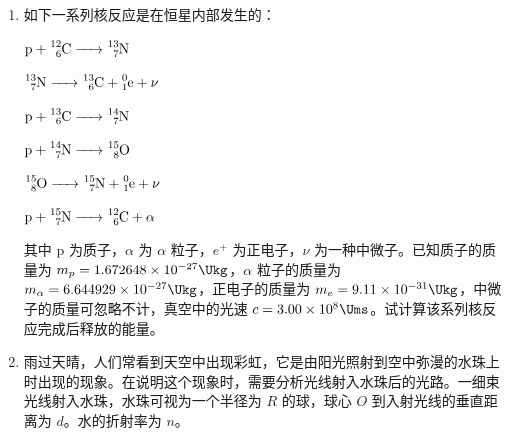 \documentclass[\gkver]{gaokaozhenti}
\begin{document}
\begin{enumerate}
{此时弧 $acb$ 和弧 $adb$ 的电阻分别为 $2\lambda R(\pi-\theta)$ 和 $2\lambda R\theta$，它们并联后的电阻为

$r=\frac{2\lambda R\theta(\pi-\theta)}{\pi}$ ②

杆中的电流为

$I=\frac{E}{r}$ ③

作用在杆上的安培力为

$F=IB(2R\sin\theta)$ ④

由以上各式解得

$F=\frac{2\pi vB^{2}R\sin^{2}\theta}{\lambda\theta(\pi-\theta)}$ ⑤
}

\item
如下一系列核反应是在恒星内部发生的：

$\ce{p + ^{12}_{6}C -> ^{13}_{7}N}$

$\ce{^{13}_{7}N -> ^{13}_{6}C + ^{0}_{1}e + \nu}$

$\ce{p + ^{13}_{6}C -> ^{14}_{7}N}$

$\ce{p + ^{14}_{7}N -> ^{15}_{8}O}$

$\ce{^{15}_{8}O -> ^{15}_{7}N + ^{0}_{1}e + \nu}$

$\ce{p + ^{15}_{7}N -> ^{12}_{6}C + \alpha}$

其中 p 为质子，$\alpha$ 为 $\alpha$ 粒子，$e^{+}$ 为正电子，$\nu$ 为一种中微子。已知质子的质量为 $m_{p}=1.672648\times10^{-27}\Ukg$，$\alpha$ 粒子的质量为 $m_{\alpha}=6.644929\times10^{-27}\Ukg$，正电子的质量为 $m_{e}=9.11\times10^{-31}\Ukg$，中微子的质量可忽略不计，真空中的光速 $c=3.00\times10^{8}\Ums$。试计算该系列核反应完成后释放的能量。



\item
雨过天晴，人们常看到天空中出现彩虹，它是由阳光照射到空中弥漫的水珠上时出现的现象。在说明这个现象时，需要分析光线射入水珠后的光路。一细束光线射入水珠，水珠可视为一个半径为 $R$ 的球，球心 $O$ 到入射光线的垂直距离为 $d$。水的折射率为 $n$。


\end{enumerate}
\end{document}
